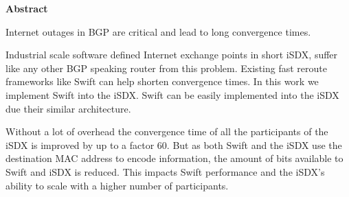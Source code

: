 \clearpage
\null
\vfil %
\thispagestyle{plain}
\begin{center}\textbf{Abstract}\end{center}
Internet outages in BGP are critical and lead to long convergence times. 

Industrial scale software defined Internet exchange points in short iSDX, suffer like any other BGP speaking router from this problem. Existing fast reroute frameworks like Swift can help shorten convergence times. In this work we implement Swift into the iSDX. Swift can be easily implemented into the iSDX due their similar architecture. 

Without a lot of overhead the convergence time of all the participants of the iSDX is improved by up to a factor $60$. But as both Swift and the iSDX use the destination MAC address to encode information, the amount of bits available to Swift and iSDX is reduced. This impacts Swift performance and the iSDX's ability to scale with a higher number of participants.
\vfil
\clearpage 

